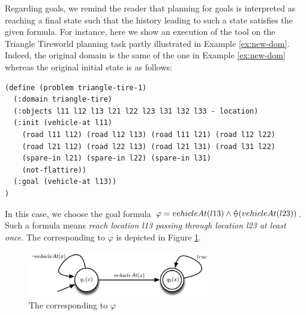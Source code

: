 Regarding \PLTL goals, we remind the reader that \FONDS planning for \PLTL goals is interpreted as reaching a final state such that the history leading to such a state satisfies the given \PLTL formula.
For instance, here we show an execution of the \FONDFOR tool on the Triangle Tireworld planning task partly illustrated in Example \ref{ex:new-dom}. Indeed, the original domain is the same of the one in Example \ref{ex:new-dom} whereas the original initial state is as follows:
\begin{lstlisting}[language=PDDL, escapechar=£]
(define (problem triangle-tire-1)
  (:domain triangle-tire)
  (:objects l11 l12 l13 l21 l22 l23 l31 l32 l33 - location)
  (:init (vehicle-at l11)
    (road l11 l12) (road l12 l13) (road l11 l21) (road l12 l22)
    (road l21 l12) (road l22 l13) (road l21 l31) (road l31 l22)
    (spare-in l21) (spare-in l22) (spare-in l31)
    (not-flattire))
  (:goal (vehicle-at l13))
)
\end{lstlisting}
In this case, we choose the \PLTL goal formula $\varphi = vehicleAt(l13) \lAND \Once(vehicleAt(l23))$. Such a formula means \emph{reach location l13 passing through location l23 at least once}. The \DFA corresponding to $\varphi$ is depicted in Figure \ref{fig:dfa-result-pltl}.

\begin{figure}[h]
\centering
\includegraphics[width=0.7\textwidth]{images/automa-param2}
\caption{The \DFA corresponding to $\varphi$} 
\label{fig:dfa-result-pltl}
\end{figure}

